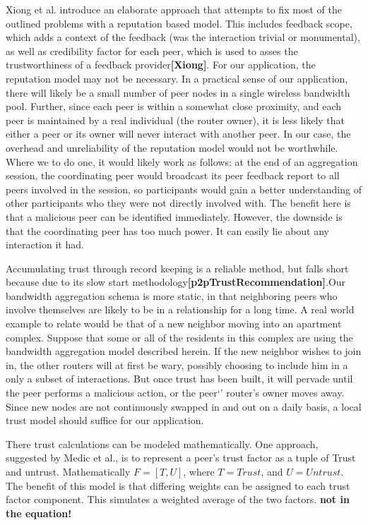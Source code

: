 \documentclass[12pt]{article}
\newcommand{\comment}[1]
{{\bfseries \color{blue} #1}}
\newcommand{\lcite}[1]
{{\bfseries\color{orange}[#1]}}
\begin{document}
			Xiong et al. introduce an elaborate approach that attempts to fix most of the outlined problems with a reputation based model. This includes feedback scope, which adds a context of the feedback (was the interaction trivial or monumental), as well as credibility factor for each peer, which is used to asses the trustworthiness of a feedback provider\lcite{Xiong}. For our application, the reputation model may not be necessary. In a practical sense of our application, there will likely be a small number of peer nodes in a single wireless bandwidth pool. Further, since each peer is within a somewhat close proximity, and each peer is maintained by a real individual (the router owner), it is less likely that either a peer or its owner will never interact with another peer. In our case, the overhead and unreliability of the reputation model would not be worthwhile. Where we to do one, it would likely work as follows: at the end of an aggregation session, the coordinating peer would broadcast its peer feedback report to all peers involved in the session, so participants would gain a better understanding of other participants who they were not directly involved with. The benefit here is that a malicious peer can be identified immediately. However, the downside is that the coordinating peer has too much power. It can easily lie about any interaction it had.

			Accumulating trust through record keeping is a reliable method, but falls short because due to its slow start methodology\lcite{p2pTrustRecommendation}.Our bandwidth aggregation schema is more static, in that neighboring peers who involve themselves are likely to be in a relationship for a long time. A real world example to relate would be that of a new neighbor moving into an apartment complex. Suppose that some or all of the residents in this complex are using the bandwidth aggregation model described herein. If the new neighbor wishes to join in, the other routers will at first be wary, possibly choosing to include him in a only a subset of interactions. But once trust has been built, it will pervade until the peer performs a malicious action, or the peer`' router's owner moves away. Since new nodes are not continuously swapped in and out on a daily basis, a local trust model should suffice for our application.

			There trust calculations can be modeled mathematically. One approach, suggested by Medic et al., is to represent a peer's trust factor as a tuple of Trust and untrust. Mathematically $F = [T,U] $, where $T = Trust$, and $U = Untrust$. The benefit of this model is that differing weights can be assigned to each trust factor component. This simulates a weighted average of the two factors.\comment{not in the equation!}
\end{document}
